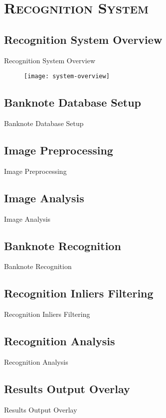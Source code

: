 \section{\scshape Recognition System}\label{sec:methodology}

\subsection{Recognition System Overview}
\begin{frame}{Recognition System Overview}
	\begin{figure}
		\centering
		\texttt{[image: system-overview]}
		\label{fig:system-overview}
	\end{figure}
\end{frame}


\subsection{Banknote Database Setup}
\begin{frame}{Banknote Database Setup}
	
\end{frame}


\subsection{Image Preprocessing}
\begin{frame}{Image Preprocessing}
	
\end{frame}


\subsection{Image Analysis}
\begin{frame}{Image Analysis}
	
\end{frame}


\subsection{Banknote Recognition}
\begin{frame}{Banknote Recognition}
	
\end{frame}


\subsection{Recognition Inliers Filtering}
\begin{frame}{Recognition Inliers Filtering}
	
\end{frame}


\subsection{Recognition Analysis}
\begin{frame}{Recognition Analysis}
	
\end{frame}


\subsection{Results Output Overlay}
\begin{frame}{Results Output Overlay}
	
\end{frame}
